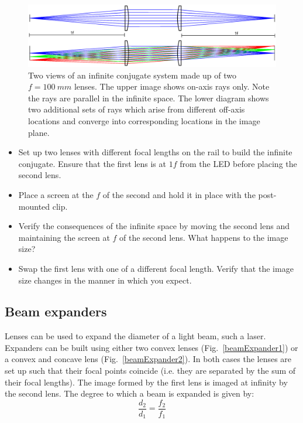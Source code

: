 \documentclass[a4paper]{report}
\begin{document}
\begin{figure}[h]
\center
\includegraphics[width=6in]{Inf_Conf_100mm.eps}
\caption{Two views of an infinite conjugate system made up of two $f=100~mm$ lenses. 
The upper image shows on-axis rays only. 
Note the rays are parallel in the infinite space.
The lower diagram shows two additional sets of rays which arise from different off-axis locations and converge into corresponding locations in the image plane. }
\label{infiniteConjugate}
\end{figure}

\begin{itemize}
\item Set up two lenses with different focal lengths on the rail to build the infinite conjugate. 
Ensure that the first lens is at $1f$ from the LED before placing the second lens. 
\item Place a screen at the $f$ of the second and hold it in place with the post-mounted clip.
\item Verify the consequences of the infinite space by moving the second lens and maintaining the screen at $f$ of the second lens. 
What happens to the image size?
\item Swap the first lens with one of a different focal length. 
Verify that the image size changes in the manner in which you expect. 
\end{itemize}



\clearpage


\subsection{Beam expanders}
Lenses can be used to expand the diameter of a light beam, such a laser.
Expanders can be built using either two convex lenses (Fig.~\ref{beamExpander1}) or a convex and concave lens (Fig.~\ref{beamExpander2}). 
In both cases the lenses are set up such that their focal points coincide (i.e. they are separated by the sum of their focal lengths). 
The image formed by the first lens is imaged at infinity by the second lens.
The degree to which a beam is expanded is given by:
\begin{equation}
\frac{d_2}{d_1}=\frac{f_2}{f_1}
\label{eq:beamExp}
\end{equation}
\end{document}
